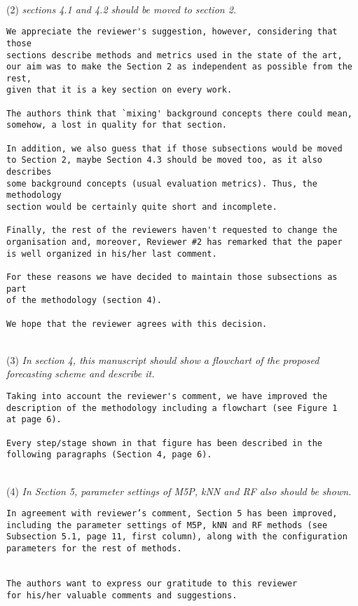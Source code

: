 \documentclass[preprint]{elsarticle}
\begin{document}
~\\
\noindent (2) \emph{sections 4.1 and 4.2 should be moved to section 2. } 

\begin{verbatim}
We appreciate the reviewer's suggestion, however, considering that those 
sections describe methods and metrics used in the state of the art, 
our aim was to make the Section 2 as independent as possible from the rest, 
given that it is a key section on every work. 

The authors think that `mixing' background concepts there could mean, 
somehow, a lost in quality for that section.

In addition, we also guess that if those subsections would be moved 
to Section 2, maybe Section 4.3 should be moved too, as it also describes 
some background concepts (usual evaluation metrics). Thus, the methodology 
section would be certainly quite short and incomplete.

Finally, the rest of the reviewers haven't requested to change the 
organisation and, moreover, Reviewer #2 has remarked that the paper 
is well organized in his/her last comment.

For these reasons we have decided to maintain those subsections as part
of the methodology (section 4).

We hope that the reviewer agrees with this decision.
\end{verbatim}


~\\
\noindent (3) \emph{In section 4, this manuscript should show a flowchart of the proposed forecasting scheme and describe it. } 

\begin{verbatim}
Taking into account the reviewer's comment, we have improved the 
description of the methodology including a flowchart (see Figure 1 
at page 6).

Every step/stage shown in that figure has been described in the 
following paragraphs (Section 4, page 6).
\end{verbatim}


~\\
\noindent (4) \emph{In Section 5, parameter settings of 
M5P, kNN and RF also should be shown. } 

\begin{verbatim}
In agreement with reviewer’s comment, Section 5 has been improved, 
including the parameter settings of M5P, kNN and RF methods (see 
Subsection 5.1, page 11, first column), along with the configuration 
parameters for the rest of methods.


The authors want to express our gratitude to this reviewer 
for his/her valuable comments and suggestions.
\end{verbatim}
\end{document}
